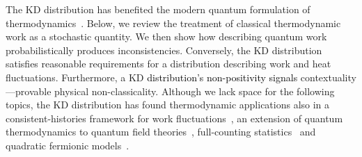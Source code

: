 \documentclass[%
 reprint,
superscriptaddress,
nofootinbib,
bibnotes,
 amsmath,amssymb,
 aps,
]{revtex4-1}
\theoremstyle{plain}
\newcommand{\Dave}[1]{\textcolor{black}{#1} }
\begin{document}
The KD distribution has benefited
the modern quantum formulation of thermodynamics~\cite{allahverdyan_nonequilibrium_2014,Solinas_probing_2016, Miller_time-reversal_2017, Levy_quasiprobability_2020,Lostaglio_quantum_2018,Lostaglio_kirkwood_2022,Teixido-Bonfill_first_2020, francica_class_2022,francica_most_2022, Hernandez-Gomez_projective_2022, Diaz_quantum_2022, Upadhyaya_what_2023, Santini_work_2023,Pei_exploring_2023, gherardini2024quasiprobabilities}.
Below, we review the treatment of classical thermodynamic work as a stochastic quantity. We then show how 
describing quantum work probabilistically produces inconsistencies. Conversely, the KD distribution 
satisfies reasonable requirements for a distribution describing work and heat fluctuations.
Furthermore, a KD \Dave{distribution's non-positivity signals} contextuality---provable physical non-classicality.
Although we lack space for the following topics,
the KD distribution has found thermodynamic applications also in a consistent-histories framework for work fluctuations~\cite{Miller_time-reversal_2017}, an extension of quantum thermodynamics to quantum field theories~\cite{Teixido-Bonfill_first_2020}, full-counting statistics~\cite{Solinas_probing_2016, francica_class_2022} and quadratic fermionic models~\cite{Santini_work_2023}.
\end{document}
